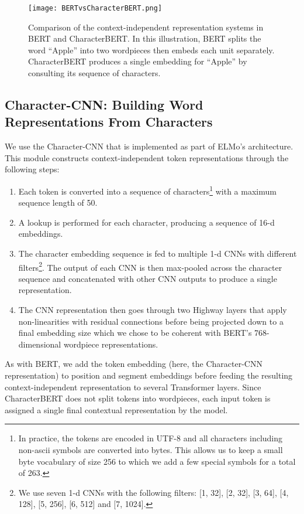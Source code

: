 \documentclass[11pt]{article}
\begin{document}
\begin{figure}[htbp] 
\begin{center} 
\texttt{[image: BERTvsCharacterBERT.png]}
\end{center} 
\caption{Comparison of the context-independent representation systems in BERT and CharacterBERT. In this illustration, BERT splits the word ``Apple'' into two wordpieces then embeds each unit separately. CharacterBERT produces a single embedding for ``Apple'' by consulting its sequence of characters.} \label{bertvscharacterbert}
\end{figure}

\subsection{Character-CNN: Building Word Representations From Characters}

We use the Character-CNN that is implemented as part of ELMo's architecture. This module constructs context-independent token representations through the following steps:
\begin{enumerate}
    \item Each token is converted into a sequence of characters\footnote{In practice, the tokens are encoded in UTF-8 and all characters including non-ascii symbols are converted into bytes. This allows us to keep a small byte vocabulary of size 256 to which we add a few special symbols for a total of 263.} with a maximum sequence length of 50. \item A lookup is performed for each character, producing a sequence of 16-d embeddings. \item The character embedding sequence is fed to multiple 1-d CNNs \cite{lecun1989backpropagation} with different filters\footnote{We use seven 1-d CNNs with the following filters: [1, 32], [2, 32], [3, 64], [4, 128], [5, 256], [6, 512] and [7, 1024].}. The output of each CNN is then max-pooled across the character sequence and concatenated with other CNN outputs to produce a single representation. \item The CNN representation then goes through two Highway layers \cite{srivastava2015training} that apply non-linearities with residual connections before being projected down to a final embedding size which we chose to be coherent with BERT's 768-dimensional wordpiece representations.

\end{enumerate}

As with BERT, we add the token embedding (here, the Character-CNN representation) to position and segment embeddings before feeding the resulting context-independent representation to several Transformer layers. Since CharacterBERT does not split tokens into wordpieces, each input token is assigned a single final contextual representation by the model.
\end{document}
